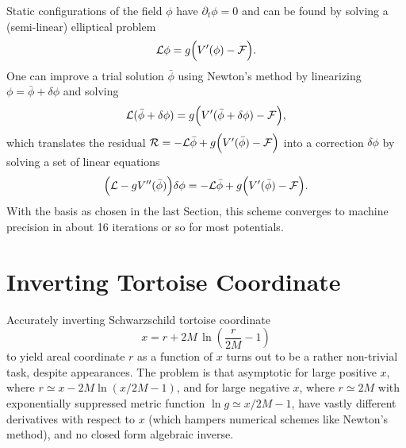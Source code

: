 \documentclass[aps,prd,reprint,twocolumn,groupedaddress]{revtex4-1}
\begin{document}
Static configurations of the field $\phi$ have $\partial_t \phi = 0$ and can be found by solving a (semi-linear) elliptical problem
\begin{equation}
  {\cal L}\phi = g \Big( V'(\phi) - {\cal F} \Big).
\end{equation}
One can improve a trial solution $\bar\phi$ using Newton's method by linearizing $\phi = \bar\phi + \delta\phi$ and solving
\begin{equation}
  {\cal L}(\bar\phi + \delta\phi) = g \Big( V'(\bar\phi + \delta\phi) - {\cal F} \Big),
\end{equation}
which translates the residual ${\cal R} = -{\cal L}\bar\phi + g \Big( V'(\bar\phi) - {\cal F} \Big)$ into a correction $\delta\phi$ by solving a set of linear equations
\begin{equation}
  \Big({\cal L} - g V''(\bar\phi)\Big) \delta\phi = -{\cal L}\bar\phi + g \Big( V'(\bar\phi) - {\cal F} \Big).
\end{equation}
With the basis as chosen in the last Section, this scheme converges to machine precision in about 16 iterations or so for most potentials.

\appendix
\section{Inverting Tortoise Coordinate}
\label{sec:tortoise}

Accurately inverting Schwarzschild tortoise coordinate
\begin{equation}
  x = r + 2M\,\ln\left(\frac{r}{2M} - 1\right)
\end{equation}
to yield areal coordinate $r$ as a function of $x$ turns out to be a rather non-trivial task, despite appearances. The problem is that asymptotic for large positive $x$, where $r \simeq x - 2M \ln\left(x/2M - 1\right)$, and for large negative $x$, where $r \simeq 2M$ with exponentially suppressed metric function $\ln g \simeq x/2M - 1$, have vastly different derivatives with respect to $x$ (which hampers numerical schemes like Newton's method), and no closed form algebraic inverse.

\end{document}
